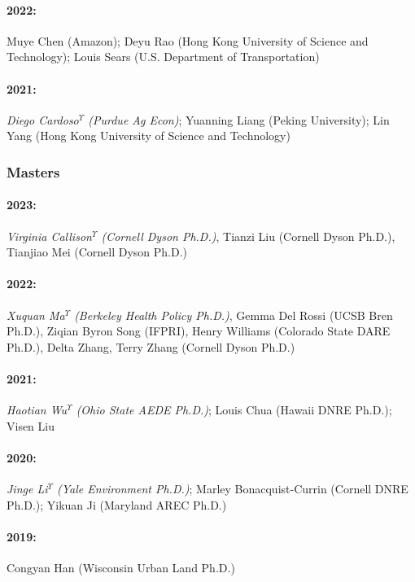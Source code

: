 \documentclass[12pt]{res} %
\begin{document}
\begin{resume}
\paragraph{2022:} Muye Chen (Amazon); Deyu Rao (Hong Kong University of Science and Technology); Louis Sears (U.S. Department of Transportation)
\vspace{-.35in}
\paragraph{2021:} \textit{Diego Cardoso$^\Upsilon$ (Purdue Ag Econ)}; Yuanning Liang (Peking University); Lin Yang (Hong Kong University of Science and Technology)

\vspace{-.2in}
 
\subsubsection{Masters}\vspace{-.2in}
\paragraph{2023:} \textit{Virginia Callison$^\Upsilon$ (Cornell Dyson Ph.D.)}, Tianzi Liu (Cornell Dyson Ph.D.), Tianjiao Mei (Cornell Dyson Ph.D.)
\vspace{-.35in} 
\paragraph{2022:} \textit{Xuquan Ma$^\Upsilon$ (Berkeley Health Policy Ph.D.)}, Gemma Del Rossi (UCSB Bren Ph.D.), Ziqian Byron Song (IFPRI), Henry Williams (Colorado State DARE Ph.D.), Delta Zhang, Terry Zhang (Cornell Dyson Ph.D.)
\vspace{-.35in}
\paragraph{2021:} \textit{Haotian Wu$^\Upsilon$ (Ohio State AEDE Ph.D.)}; Louis Chua (Hawaii DNRE Ph.D.); Visen Liu
\vspace{-.35in}
\paragraph{2020:} \textit{Jinge Li$^\Upsilon$ (Yale Environment Ph.D.)}; Marley Bonacquist-Currin (Cornell DNRE Ph.D.); Yikuan Ji (Maryland AREC Ph.D.)
\vspace{-.35in}
\paragraph{2019:} Congyan Han (Wisconsin Urban Land Ph.D.)


\end{resume}
\end{document}
